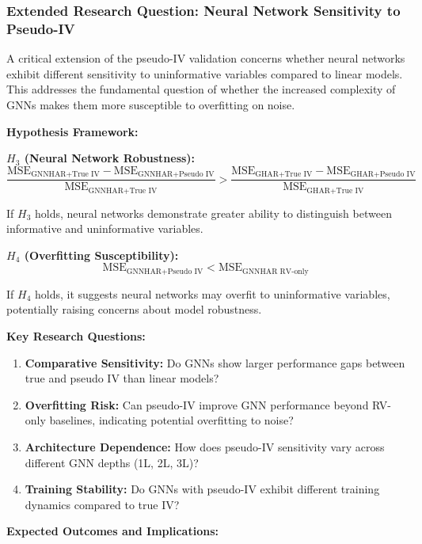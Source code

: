 \documentclass[12pt,a4paper]{article}
\begin{document}
\subsubsection{Extended Research Question: Neural Network Sensitivity to Pseudo-IV}

A critical extension of the pseudo-IV validation concerns whether neural networks exhibit different sensitivity to uninformative variables compared to linear models. This addresses the fundamental question of whether the increased complexity of GNNs makes them more susceptible to overfitting on noise.

\textbf{Hypothesis Framework:}

\textbf{$H_3$ (Neural Network Robustness):} 
$$\frac{\text{MSE}_{\text{GNNHAR+True IV}} - \text{MSE}_{\text{GNNHAR+Pseudo IV}}}{\text{MSE}_{\text{GNNHAR+True IV}}} > \frac{\text{MSE}_{\text{GHAR+True IV}} - \text{MSE}_{\text{GHAR+Pseudo IV}}}{\text{MSE}_{\text{GHAR+True IV}}}$$

If $H_3$ holds, neural networks demonstrate greater ability to distinguish between informative and uninformative variables.

\textbf{$H_4$ (Overfitting Susceptibility):}
$$\text{MSE}_{\text{GNNHAR+Pseudo IV}} < \text{MSE}_{\text{GNNHAR RV-only}}$$

If $H_4$ holds, it suggests neural networks may overfit to uninformative variables, potentially raising concerns about model robustness.

\textbf{Key Research Questions:}

\begin{enumerate}
\item \textbf{Comparative Sensitivity:} Do GNNs show larger performance gaps between true and pseudo IV than linear models?

\item \textbf{Overfitting Risk:} Can pseudo-IV improve GNN performance beyond RV-only baselines, indicating potential overfitting to noise?

\item \textbf{Architecture Dependence:} How does pseudo-IV sensitivity vary across different GNN depths (1L, 2L, 3L)?

\item \textbf{Training Stability:} Do GNNs with pseudo-IV exhibit different training dynamics compared to true IV?
\end{enumerate}

\textbf{Expected Outcomes and Implications:}
\end{document}
